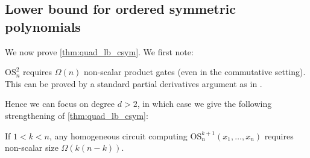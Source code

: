 \documentclass[11pt]{article}
\newcommand{\esym}[2]{\mathrm{OS}_{#1}^{#2}}
\begin{document}
\subsection{Lower bound for ordered symmetric polynomials}

We now prove \autoref{thm:quad_lb_csym}. We first note: 

\begin{remark}\label{rem:standard} 
  $\esym{n}{2}$ requires $\Omega(n)$ non-scalar product gates (even in the commutative setting). 
  This can be proved by a standard partial derivatives argument as in \cite{NW97}. 
\end{remark}

Hence we can focus on degree $d>2$, in which case we give the following strengthening of \autoref{thm:quad_lb_csym}:

\begin{theorem}\label{thm:esym}
  If $1<k < n $, any homogeneous circuit computing $\esym{n}{k+1}(x_1,\dots,x_n)$
  requires  non-scalar size $\Omega(k(n-k))$.
\end{theorem}
\end{document}
